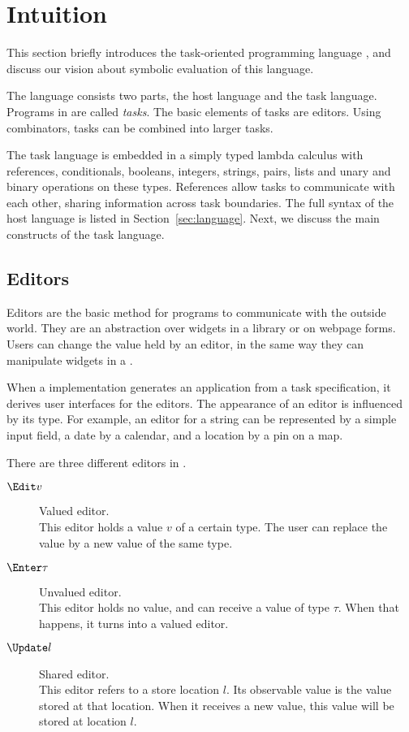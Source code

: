 
\section{Intuition}
\label{sec:intuition}

This section briefly introduces the task-oriented programming language \TOPHAT,
and discuss our vision about symbolic evaluation of this language.

The \TOPHAT language consists two parts, the host language and the task language.
Programs in \TOPHAT are called \emph{tasks}.
The basic elements of tasks are editors.
Using combinators, tasks can be combined into larger tasks.

The task language is embedded in a simply typed lambda calculus with references, conditionals, booleans, integers, strings, pairs, lists and unary and binary operations on these types.
References allow tasks to communicate with each other, sharing information across task boundaries.
The full syntax of the host language is listed in Section~\ref{sec:language}.
Next, we discuss the main constructs of the task language.


\subsection{Editors}

Editors are the basic method for programs to communicate with the outside world.
They are an abstraction over widgets in a \GUI library or on webpage forms.
Users can change the value held by an editor, in the same way they can manipulate widgets in a \GUI.

When a \TOP implementation generates an application from a task specification, it derives user interfaces for the editors.
The appearance of an editor is influenced by its type.
For example, an editor for a string can be represented by a simple input field, a date by a calendar, and a location by a pin on a map.

There are three different editors in \TOPHAT.
\begin{description}
  \item[$\Edit v$] Valued editor.\\
    This editor holds a value $v$ of a certain type.
    The user can replace the value by a new value of the same type.
  \item[$\Enter \tau$] Unvalued editor.\\
    This editor holds no value, and can receive a value of type $\tau$.
    When that happens, it turns into a valued editor.
  \item[$\Update l$] Shared editor.\\
    This editor refers to a store location $l$.
    Its observable value is the value stored at that location.
    When it receives a new value, this value will be stored at location $l$.
\end{description}



